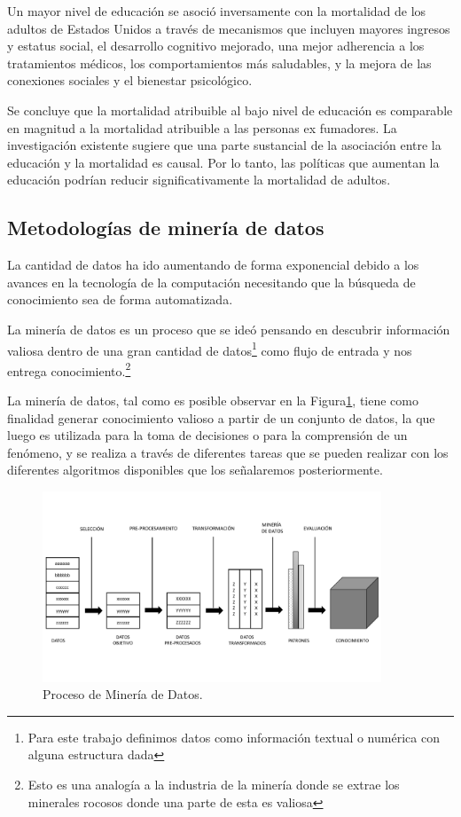 Un mayor nivel de educación se asoció inversamente con la mortalidad de los adultos de Estados Unidos a través de mecanismos que incluyen mayores ingresos y estatus social, el desarrollo cognitivo mejorado, una mejor adherencia a los tratamientos médicos, los comportamientos más saludables, y la mejora de las conexiones sociales y el bienestar psicológico.

Se concluye que la mortalidad atribuible al bajo nivel de educación es comparable en magnitud a la mortalidad atribuible a las personas ex fumadores. La investigación existente sugiere que una parte sustancial de la asociación entre la educación y la mortalidad es causal. Por lo tanto, las políticas que aumentan la educación podrían reducir significativamente la mortalidad de adultos.

\subsection{Metodologías de minería de datos}

La cantidad de datos ha ido aumentando de forma exponencial debido a los avances en la tecnología de la computación necesitando que la búsqueda de conocimiento sea de forma automatizada.

La minería de datos es un proceso que se ideó pensando en descubrir información valiosa dentro de una gran cantidad de datos\footnote{Para este trabajo definimos datos como información textual o numérica con alguna estructura dada} como flujo de entrada y nos entrega conocimiento.\footnote{Esto es una analogía a la industria de la minería donde se extrae los minerales rocosos donde una parte de esta es valiosa}

La minería de datos, tal como es posible observar en la Figura\ref{fig:datamining}, tiene como finalidad generar conocimiento  valioso a partir de un conjunto de datos, la que luego es utilizada para la toma de decisiones o para la comprensión de un fenómeno, y se realiza a través de diferentes tareas que se pueden realizar con los diferentes algoritmos disponibles que los señalaremos posteriormente.

\begin{figure}[H]
  \centering
    \includegraphics[width=0.9\textwidth]{Figuras/DM}
      \caption{Proceso de Minería de Datos.}
    \label{fig:datamining}
\end{figure}

